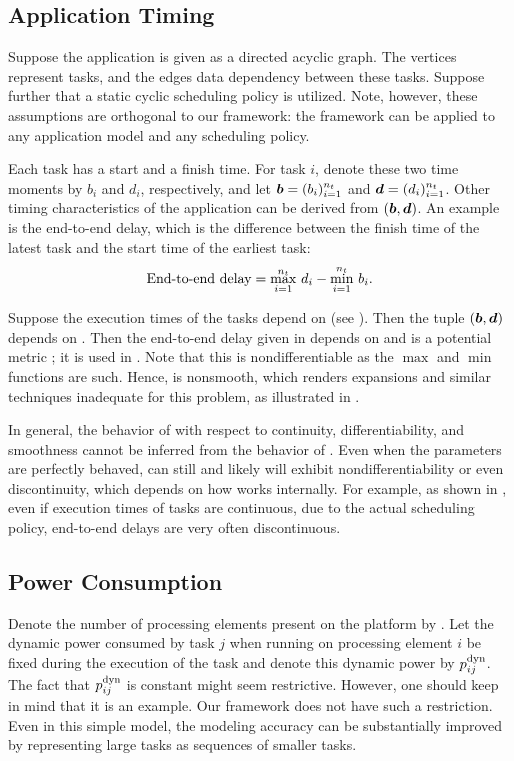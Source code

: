 \subsection{Application Timing}

Suppose the application is given as a directed acyclic graph. The vertices
represent tasks, and the edges data dependency between these tasks. Suppose
further that a static cyclic scheduling policy is utilized. Note, however, these
assumptions are orthogonal to our framework: the framework can be applied to any
application model and any scheduling policy.

Each task has a start and a finish time. For task $i$, denote these two time
moments by $b_i$ and $d_i$, respectively, and let $\boldsymbol{b} = (b_i)_{i = 1}^{n_{t}}$
and $\boldsymbol{d} = (d_i)_{i = 1}^{n_{t}}$. Other timing characteristics of the application
can be derived from $(\boldsymbol{b}, \boldsymbol{d})$. An example is the end-to-end delay, which
is the difference between the finish time of the latest task and the start time
of the earliest task:
\[
  \text{End-to-end delay} = \max_{i = 1}^{n_{t}} \, d_i - \min_{i = 1}^{n_{t}} \, b_i.
\]

Suppose the execution times of the tasks depend on \vu (see ).
Then the tuple $(\boldsymbol{b}, \boldsymbol{d})$ depends on \vu. Then the end-to-end delay given
in  depends on \vu and is a potential metric \g; it is
used in . Note that this \g is nondifferentiable as the $\max$ and
$\min$ functions are such. Hence, \g is nonsmooth, which renders 
expansions and similar techniques inadequate for this problem, as illustrated in
.

\begin{remark}
In general, the behavior of \g with respect to continuity, differentiability,
and smoothness cannot be inferred from the behavior of \vu. Even when the
parameters are perfectly behaved, \g can still and likely will exhibit
nondifferentiability or even discontinuity, which depends on how \g works
internally. For example, as shown in \cite{tanasa2015}, even if execution times
of tasks are continuous, due to the actual scheduling policy, end-to-end delays
are very often discontinuous.
\end{remark}

\subsection{Power Consumption}

Denote the number of processing elements present on the platform by \np. Let the
dynamic power consumed by task $j$ when running on processing element $i$ be
fixed during the execution of the task and denote this dynamic power by
$p^{\mathrm{dyn}}_{ij}$. The fact that $p^{\mathrm{dyn}}_{ij}$ is constant might seem
restrictive. However, one should keep in mind that it is an example. Our
framework does not have such a restriction. Even in this simple model, the
modeling accuracy can be substantially improved by representing large tasks as
sequences of smaller tasks.

